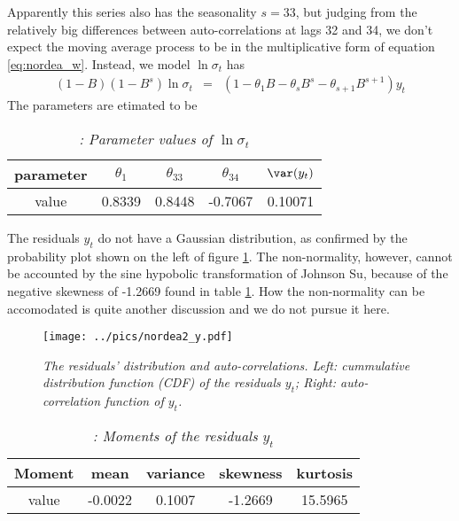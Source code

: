 Apparently this series also has the seasonality $s = 33$, but judging
from the relatively big differences between auto-correlations at lags
32 and 34, we don't expect the moving average process to be in the
multiplicative form of equation \ref{eq:nordea_w}. Instead, we model
$\ln\sigma_t$ has
\begin{eqnarray}
  (1 - B)(1 - B^s) \ln\sigma_t &=& (1 - \theta_1 B - \theta_s B^s -
  \theta_{s+1} B^{s+1} ) y_t \label{eq:nordea2_v}
\end{eqnarray}
The parameters are etimated to be
\begin{table}[htb!]
  \centering
  \begin{tabular}{|c|c|c|c|c|}
    \hline
    parameter & $\theta_1$ & $\theta_{33}$ & $\theta_{34}$ & $\var(y_t)$ \\
    \hline
    value & 0.8339 & 0.8448 & -0.7067 & 0.10071 \\
    \hline
  \end{tabular}
  \caption{\small \it: Parameter values of $\ln \sigma_t$}
\end{table}

The residuals $y_t$ do not have a Gaussian distribution, as confirmed
by the probability plot shown on the left of figure
\ref{fig:nordea2_y}. The non-normality, however, cannot be accounted
by the sine hypobolic transformation of Johnson Su, because of the
negative skewness of -1.2669 found in table
\ref{tab:nordea2_y_mmt}. How the non-normality can be accomodated is
quite another discussion and we do not pursue it here.
\begin{figure}[htb!]
  \centering
  \texttt{[image: ../pics/nordea2\_y.pdf]}
  \caption{\small \it The residuals' distribution and auto-correlations. Left:
    cummulative distribution function (CDF) of the residuals $y_t$; Right:
    auto-correlation function of $y_t$.}
  \label{fig:nordea2_y}
\end{figure}

\begin{table}[htb!]
  \centering
  \begin{tabular}{|c|c|c|c|c|}
    \hline
    Moment & mean & variance & skewness & kurtosis \\
    \hline
    value & -0.0022 & 0.1007 & -1.2669 & 15.5965 \\
    \hline
  \end{tabular}
  \caption{\small \it: Moments of the residuals $y_t$}
  \label{tab:nordea2_y_mmt}
\end{table}

